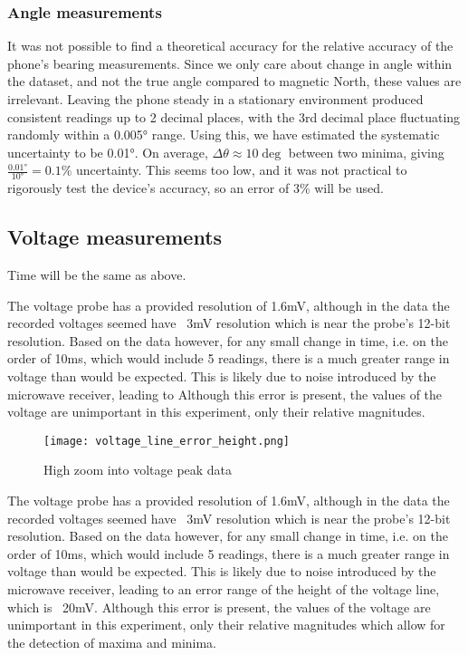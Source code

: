 \subsubsection*{Angle measurements}

It was not possible to find a theoretical accuracy for the relative accuracy of the phone's bearing measurements. Since we only care about change in angle within the dataset, and not the true angle compared to magnetic North, these values are irrelevant. Leaving the phone steady in a stationary environment produced consistent readings up to 2 decimal places, with the 3rd decimal place fluctuating randomly within a 0.005° range. Using this, we have estimated the systematic uncertainty to be 0.01°. 
On average, $\Delta \theta \approx 10\deg$ between two minima, giving $\frac{0.01°}{10°}= 0.1\%$ uncertainty. This seems too low, and it was not practical to rigorously test the device's accuracy, so an error of 3\% will be used.

\subsection*{Voltage measurements}

Time will be the same as above.

The voltage probe has a provided resolution of 1.6mV, although in the data the recorded voltages seemed have ~3mV resolution which is near the probe's 12-bit resolution.
Based on the data however, for any small change in time, i.e. on the order of 10ms, which would include 5 readings, there is a much greater range in voltage than would be expected. This is likely due to noise introduced by the microwave receiver, leading to 
 Although this error is present, the values of the voltage are unimportant in this experiment, only their relative magnitudes.

\begin{wrapfigure}{r}{0.3\textwidth}
	\centering
	\texttt{[image: voltage\_line\_error\_height.png]}
	\caption{High zoom into voltage peak data}
\end{wrapfigure} 

The voltage probe has a provided resolution of 1.6mV, although in the data the recorded voltages seemed have ~3mV resolution which is near the probe's 12-bit resolution.
Based on the data however, for any small change in time, i.e. on the order of 10ms, which would include 5 readings, there is a much greater range in voltage than would be expected. This is likely due to noise introduced by the microwave receiver, leading to an error range of the height of the voltage line, which is ~20mV.
 Although this error is present, the values of the voltage are unimportant in this experiment, only their relative magnitudes which allow for the detection of maxima and minima.

